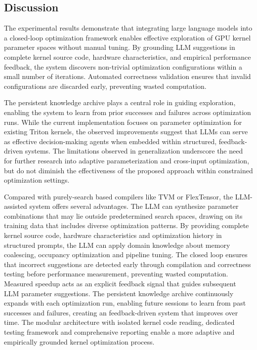 \documentclass{article}
\begin{document}
\subsection{Discussion}

The experimental results demonstrate that integrating large language models into a closed-loop optimization framework enables effective exploration of GPU kernel parameter spaces without manual tuning. By grounding LLM suggestions in complete kernel source code, hardware characteristics, and empirical performance feedback, the system discovers non-trivial optimization configurations within a small number of iterations. Automated correctness validation ensures that invalid configurations are discarded early, preventing wasted computation.

The persistent knowledge archive plays a central role in guiding exploration, enabling the system to learn from prior successes and failures across optimization runs. While the current implementation focuses on parameter optimization for existing Triton kernels, the observed improvements suggest that LLMs can serve as effective decision-making agents when embedded within structured, feedback-driven systems. The limitations observed in generalization underscore the need for further research into adaptive parameterization and cross-input optimization, but do not diminish the effectiveness of the proposed approach within constrained optimization settings.\newline 

Compared with purely-search based compilers like TVM or FlexTensor, the LLM-assisted system offers several advantages. The LLM can synthesize parameter combinations that may lie outside predetermined search spaces, drawing on its training data that includes diverse optimization patterns. By providing complete kernel source code, hardware characteristics and optimization history in structured prompts, the LLM can apply domain knowledge about memory coalescing, occupancy optimization and pipeline tuning. The closed loop ensures that incorrect suggestions are detected early through compilation and correctness testing before performance measurement, preventing wasted computation. Measured speedup acts as an explicit feedback signal that guides subsequent LLM parameter suggestions. The persistent knowledge archive continuously expands with each optimization run, enabling future sessions to learn from past successes and failures, creating an feedback-driven system that improves over time. The modular architecture with isolated kernel code reading, dedicated testing framework and comprehensive reporting enable a more adaptive and empirically grounded kernel optimization process. 
\end{document}

